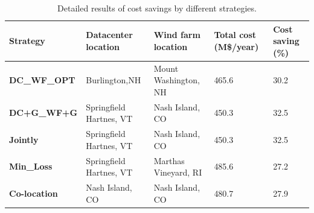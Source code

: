 \begin{table}[ht]
\begin{center}
\caption{Detailed results of cost savings by different strategies.}
\begin{tabular}{|l|p{50pt}|p{50pt}|p{30pt}|p{20pt}|}
\hline
\textbf{Strategy}& \textbf{Datacenter location} &\textbf{Wind farm location} &\textbf{Total cost (M\$/year)} &\textbf{Cost saving (\%)} \\
\hline
\textbf{DC\_WF\_OPT} &  Burlington,NH  & Mount Washington, NH &465.6& 30.2 \\
\textbf{DC+G\_WF+G} &Springfield Hartnes, VT  & Nash Island, CO&450.3& 32.5\\
\textbf{Jointly} &Springfield Hartnes, VT&  Nash Island, CO & 450.3 & 32.5\\
\textbf{Min\_Loss} &Springfield Hartnes, VT & Marthas Vineyard, RI & 485.6& 27.2 \\
\textbf{Co-location}& Nash Island, CO &Nash Island, CO&480.7 & 27.9  \\
\hline
\end{tabular}
\label{tab:costsaving}
\end{center}
\end{table}
